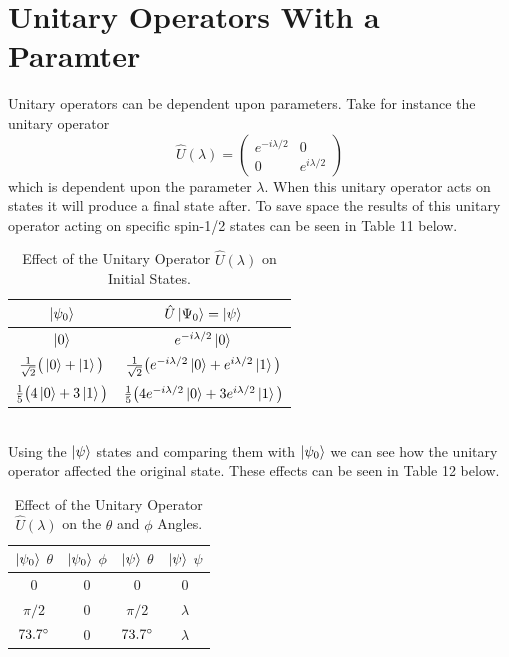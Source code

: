 \documentclass[twocolumn]{article}
\begin{document}
\section*{Unitary Operators With a Paramter}
Unitary operators can be dependent upon parameters. Take for instance the unitary operator
\begin{equation}
\hat{U}(\lambda)=
\begin{pmatrix}
e^{-i\lambda/2} & 0 \\
0 & e^{i\lambda/2}
\end{pmatrix}
\end{equation}
which is dependent upon the parameter $\lambda$. When this unitary operator acts on states it will produce a final state after. To save space the results of this unitary operator acting on specific spin-1/2 states can be seen in Table 11 below.
\begin{table}[h!]
\begin{center}
\begin{tabular}{ |c|c| }
\hline $\ket{\psi_0}$& $\hat{U}\ket{\Psi_0}=\ket{\psi}$ \\
\hline $\ket{0}$& $e^{-i\lambda/2}\ket{0}$\\
\hline $\frac{1}{\sqrt{2}}\big(\ket{0}+\ket{1}\big)$& $\frac{1}{\sqrt{2}}\big(e^{-i\lambda/2}\ket{0}+e^{i\lambda/2}\ket{1}\big)$\\
\hline $\frac{1}{5}\big(4\ket{0}+3\ket{1}\big)$& $\frac{1}{5}\big(4e^{-i\lambda/2}\ket{0}+3e^{i\lambda/2}\ket{1}\big)$\\
\hline
\end{tabular}
\caption{Effect of the Unitary Operator $\hat{U}(\lambda)$ on Initial States.}
\end{center}
\end{table} \\
Using the $\ket{\psi}$ states and comparing them with $\ket{\psi_0}$ we can see how the unitary operator affected the original state. These effects can be seen in Table 12 below.
\begin{table}[h!]
\begin{center}
\begin{tabular}{ |c|c|c|c| }
\hline $\ket{\psi_0}$ $\theta$& $\ket{\psi_0}$ $\phi$& $\ket{\psi}$ $\theta$& $\ket{\psi}$ $\psi$ \\
\hline 0 & 0 & 0 & 0 \\
\hline $\pi/2$ & 0 & $\pi/2$ & $\lambda$ \\
\hline $73.7\degree$ & $0$ & $73.7\degree$ & $\lambda$ \\
\hline
\end{tabular}
\caption{Effect of the Unitary Operator $\hat{U}(\lambda)$ on the $\theta$ and $\phi$ Angles.}
\end{center}
\end{table} \\
\end{document}

